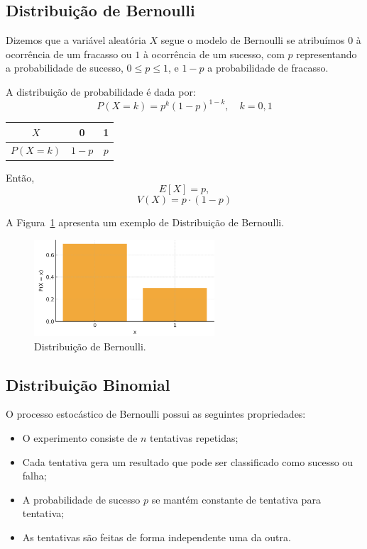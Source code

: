 \documentclass{article}
\begin{document}
\subsection{Distribuição de Bernoulli}
Dizemos que a variável aleatória $X$ segue o modelo de Bernoulli se atribuímos $0$ à ocorrência de um fracasso ou $1$ à ocorrência de um sucesso, com $p$ representando a probabilidade de sucesso,  
$0 \leq p \leq 1$, e $1 - p$ a probabilidade de fracasso.

A distribuição de probabilidade é dada por:
    $$
    P(X = k) = p^k (1 - p)^{1 - k}, \quad k = 0, 1
    $$

    \begin{center}
    \begin{tabular}{c|cc}
    $X$ & 0 & 1 \\
    \hline
    $P(X = k)$ & $1 - p$ & $p$
    \end{tabular}
    \end{center}

Então,
    $$
    E[X] = p,
    $$
    $$
    V(X) = p \cdot (1-p)
    $$

A Figura~\ref{fig:dist_disc_bernoulli} apresenta um exemplo de Distribuição de Bernoulli.

\begin{figure}[H]
    \centering
    \includegraphics[width=0.6\textwidth]{figuras/dist_disc_bernoulli.png}
    \caption{Distribuição de Bernoulli.}
    \label{fig:dist_disc_bernoulli}
\end{figure}

\subsection{Distribuição Binomial}
O processo estocástico de Bernoulli possui as seguintes propriedades:
\begin{itemize}
    \item O experimento consiste de $n$ tentativas repetidas;
    \item Cada tentativa gera um resultado que pode ser classificado como sucesso ou falha;
    \item A probabilidade de sucesso $p$ se mantém constante de tentativa para tentativa;
    \item As tentativas são feitas de forma independente uma da outra.
\end{itemize}
\end{document}
